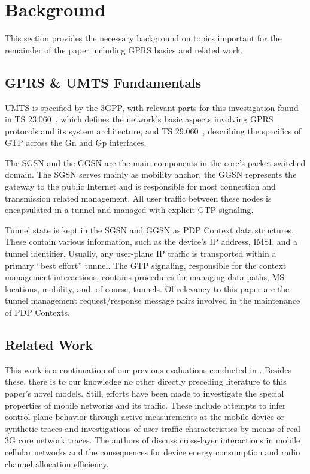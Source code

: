 \section{Background}
\label{sec:background}
This section provides the necessary background on topics important for the remainder of the paper including \gls{GPRS} basics and related work.
\subsection{\acrshort{GPRS} \& \acrshort{UMTS} Fundamentals}\label{sec:gprs_fundamentals}
UMTS is specified by the \gls{3GPP}, with relevant parts for this investigation found in \gls{TS} 23.060~\cite{3gpp23060}, which defines the network's basic aspects involving \gls{GPRS} protocols and its system architecture, and \gls{TS} 29.060~\cite{3gpp29060}, describing the specifics of \gls{GTP} across the Gn and Gp interfaces.

The \gls{SGSN} and the \gls{GGSN} are the main components in the core's packet switched domain.
The \gls{SGSN} serves mainly as mobility anchor, the \gls{GGSN} represents the gateway to the public Internet and is responsible for most connection and transmission related management. All user traffic between these nodes is encapsulated in a tunnel and managed with explicit \gls{GTP} signaling.

Tunnel state is kept in the \gls{SGSN} and \gls{GGSN} as \gls{PDP} Context data structures.
These contain various information, such as the device's IP address, \gls{IMSI}, and a tunnel identifier.
Usually, any user-plane IP traffic is transported within a primary ``best effort'' tunnel.
The \gls{GTP} signaling, responsible for the context management interactions, contains procedures for managing data paths, \gls{MS} locations, mobility, and, of course, tunnels.
Of relevancy to this paper are the tunnel management request/response message pairs involved in the maintenance of \gls{PDP} Contexts.

\subsection{Related Work}
\label{sec:related_work}

This work is a continuation of our previous evaluations conducted in \cite{metzger2012research, metzger2014jcnc}.
Besides these, there is to our knowledge no other directly preceding literature to this paper's novel models.
Still, efforts have been made to investigate the special properties of mobile networks and its traffic.
These include attempts to infer control plane behavior through active measurements at the mobile device or synthetic traces and investigations of user traffic characteristics by means of real 3G core network traces.
The authors of \cite{qian2011profiling} discuss cross-layer interactions in mobile cellular networks and the consequences for device energy consumption and radio channel allocation efficiency.

